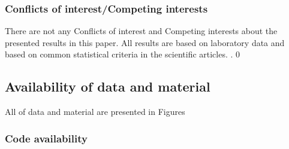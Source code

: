 \documentclass[suppldata]{interact}
\begin{document}
\subsubsection{Conflicts of interest/Competing interests}
There are not any Conflicts of interest and Competing interests about the presented results in this paper. All results are based on laboratory data and based on common statistical criteria in the scientific articles.
.
0
\subsection{Availability of data and material}
All of data and material are presented in Figures
\subsubsection{Code availability}
\end{document}
